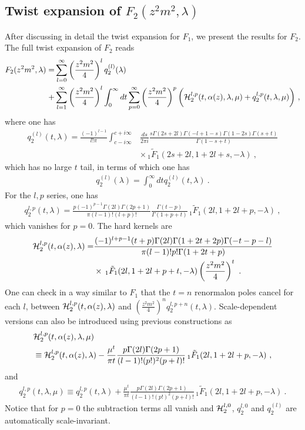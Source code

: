 \documentclass[a4paper,11pt]{article}
\begin{document}
\subsection{Twist expansion of $F_2(z^2m^2,\lambda)$}
After discussing in detail the twist expansion for $F_1$, we present the results for $F_2$. The full twist expansion of $F_2$ reads
\begin{align}\label{eq:F2fullexpansion}
F_2(z^2m^2,\lambda)=&\sum_{l=0}^{\infty} \left(\frac{z^2m^2}{4}\right)^l q_2^{(l)}(\lambda)\nonumber \\ 
+&\sum_{l=1}^{\infty} \left(\frac{z^2m^2}{4}\right)^l\int_{0}^{\infty} dt \sum_{p=0}^{\infty}\left(\frac{z^2m^2}{4}\right)^{p}\bigg({\cal H}_2^{l,p}(t,\alpha(z),\lambda,\mu)+q_{2}^{l,p}(t,\lambda,\mu)\bigg) \ ,
\end{align}
where one has
\begin{align}\label{eq:q2l}
q_2^{(l)}(t,\lambda)=\frac{(-1)^{l-1}}{l!\pi}\int_{c-i\infty}^{c+i\infty}&\frac{ds}{2\pi i}\frac{s\Gamma(2s+2l)\Gamma(-l+1-s)\Gamma(1-2s)\Gamma(s+t)}{\Gamma(1-s+t)} \nonumber \\ 
&\times \,_1\tilde F_1(2s+2l,1+2l+s,-\lambda) \ , 
\end{align}
which has no large $t$ tail, in terms of which one has
\begin{align}
q_2^{(l)}(\lambda)=\int_{0}^{\infty}dt q_2^{(l)}(t,\lambda)  \ .
\end{align}
For the $l,p$ series, one has 
\begin{align}\label{eq:q2lp}
q_2^{l,p}(t,\lambda)=\frac{p(-1)^{p-1}\Gamma(2l)\Gamma(2p+1)}{\pi(l-1)!(l+p)!}\frac{\Gamma(t-p)}{\Gamma(1+p+t)}\,_1\tilde F_1(2l,1+2l+p,-\lambda) \ ,
\end{align}
which vanishes for $p=0$. The hard kernels are
\begin{align}\label{eq:H2lp}
{\cal H}_2^{l,p}(t,\alpha(z),\lambda)=&\frac{(-1)^{l+p-1}(t+p)\Gamma(2l)\Gamma(1+2t+2p)\Gamma(-t-p-l)}{\pi (l-1)!p!\Gamma(1+2t+p)}\nonumber \\ &\times \,_1 \tilde F_1(2l,1+2l+p+t,-\lambda)\left(\frac{z^2m^2}{4}\right)^t \ .
\end{align}
 One can check in a way similar to $F_1$ that the $t=n$ renormalon poles cancel for each $l$, between ${\cal H}_{2}^{l,p}(t,\alpha(z),\lambda)$ and $\left(\frac{z^2m^2}{
4}\right)^nq^{l,p+n}_2(t,\lambda)$. Scale-dependent versions can also be introduced using previous constructions as 
\begin{align}\label{eq:H2lpmu}
&{\cal H}_2^{l,p}(t,\alpha(z),\lambda,\mu)\nonumber \\ 
&\equiv {\cal H}_2^{l,p}(t,\alpha(z),\lambda)-\frac{\mu^t}{\pi t}\frac{p\Gamma(2l)\Gamma(2p+1)}{(l-1)!(p!)^2(p+l)!} \,_1\tilde F_1(2l,1+2l+p,-\lambda) \ , 
\end{align}
and 
\begin{align}\label{eq:q2lpmu}
q_2^{l,p}(t,\lambda,\mu)\equiv q_2^{l,p}(t,\lambda)+\frac{\mu^t}{\pi t}\frac{p\Gamma(2l)\Gamma(2p+1)}{(l-1)!(p!)^2(p+l)!} \,_1\tilde F_1(2l,1+2l+p,-\lambda) \ .
\end{align}
 Notice that for $p=0$ the subtraction terms all vanish and ${\cal H}_2^{l,0}$, $q_2^{l,0}$ and $q_2^{(l)}$ are automatically scale-invariant. 
\end{document}
